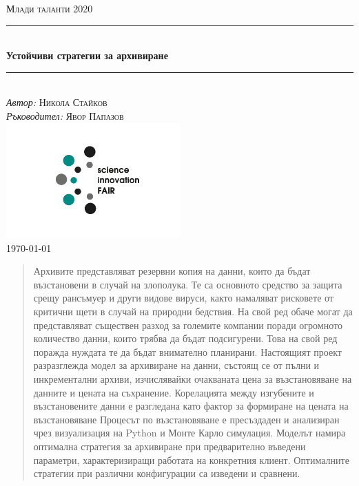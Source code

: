 \documentclass[11pt, a4paper]{article}
\theoremstyle{definition}
\begin{document}
\begin{titlepage}
	\newcommand{\HRule}{\rule{\linewidth}{0.5mm}}
	\centering
	\textsc{\LARGE Млади таланти 2020}\\[1cm]
	\HRule\\[1 cm]
	{\huge\bfseries Устойчиви стратегии за архивиране}\\[0.5 cm] 
	\HRule\\
	\vfill
	\Large
	\textit{Автор:}
	\textsc{Никола Стайков}\\
	\vspace{2cm}
	\Large
	\textit{Ръководител:}
	\textsc{Явор Папазов}\\
	\includegraphics[width=0.5\textwidth]{Innofair_logo.png}\\
	\vfill	
	{\large\today}   
	\vfill
\end{titlepage}

\tableofcontents
\newpage
\begin{abstract}
		Архивите представляват резервни копия на данни, които да бъдат възстановени в случай на злополука. Те са основното средство за защита срещу рансъмуер и други видове вируси, както намаляват рисковете от критични щети в случай на природни бедствия. На свой ред обаче могат да представляват съществен разход за големите компании поради огромното количество данни, които трябва да бъдат подсигурени. Това на свой ред поражда нуждата те да бъдат внимателно планирани. Настоящият проект разразглежда модел за архивиране на данни, състоящ се от пълни и инкрементални архиви, изчислявайки очакваната цена за възстановяване на данните и цената на съхранение. Корелацията между изгубените и възстановените данни е разгледана като фактор за формиране на цената на възстановяване Процесът по възстановяване е пресъздаден и анализиран чрез визуализация на Python и Монте Карло симулация. Моделът намира оптимална стратегия за архивиране при предварително въведени параметри, характеризиращи работата на конкретния клиент. Оптималните стратегии при различни конфигурации са изведени и сравнени.
\end{abstract}
\end{document}
